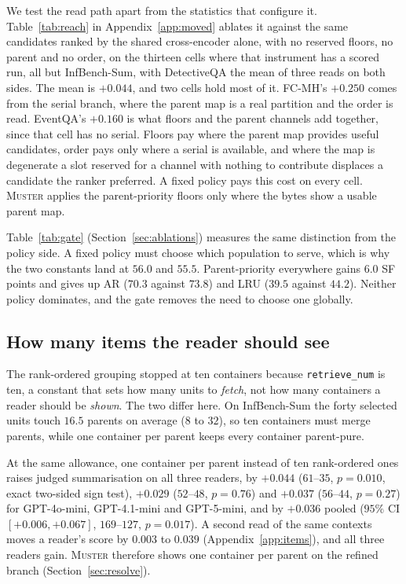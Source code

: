 \documentclass{article}
\newcommand{\sys}{\textsc{Muster}}
\begin{document}
We test the read path apart from the statistics that configure it.
Table~\ref{tab:reach} in Appendix~\ref{app:moved} ablates it against the same candidates ranked by the
shared cross-encoder alone, with no reserved floors, no parent and no order, on the thirteen cells
where that instrument has a scored run, all but InfBench-Sum, with DetectiveQA the mean of three reads on both sides. The mean is $+0.044$, and two cells hold most of it. FC-MH's
$+0.250$ comes from the serial branch, where the parent map is a real partition and the order is
read. EventQA's $+0.160$ is what floors and the parent channels add together, since that
cell has no serial. Floors pay where the parent map provides useful
candidates, order pays only where a serial is available, and
where the map is degenerate a slot reserved for a channel with nothing to contribute displaces a
candidate the ranker preferred. A fixed policy pays this cost on every cell. \sys{} applies the parent-priority floors only where the bytes show a usable parent map.

Table~\ref{tab:gate} (Section~\ref{sec:ablations}) measures the same distinction from the policy side.
A fixed policy must choose which population to serve, which is why the two constants land at $56.0$ and $55.5$.
Parent-priority everywhere gains $6.0$ SF points and gives up AR ($70.3$ against $73.8$) and LRU ($39.5$ against $44.2$). Neither policy dominates, and the gate removes the need to choose one globally.

\subsection{How many items the reader should see}\label{sec:items}

The rank-ordered grouping stopped at ten containers because \texttt{retrieve\_num} is
ten, a constant that sets how many units to \emph{fetch}, not how many containers a
reader should be \emph{shown}. The two differ here. On InfBench-Sum the forty selected units touch $16.5$
parents on average ($8$ to $32$), so ten containers must merge parents, while one container per parent
keeps every container parent-pure.

At the same allowance, one container per parent instead of ten rank-ordered ones raises judged summarisation on all
three readers, by $+0.044$ ($61$--$35$, $p=0.010$, exact two-sided sign test), $+0.029$ ($52$--$48$, $p=0.76$) and $+0.037$ ($56$--$44$,
$p=0.27$) for GPT-4o-mini, GPT-4.1-mini and GPT-5-mini, and by $+0.036$ pooled ($95\%$ CI $[+0.006, +0.067]$,
$169$--$127$, $p=0.017$). A second read of the same contexts moves a reader's score by $0.003$ to $0.039$
(Appendix~\ref{app:items}), and all three readers gain. \sys{} therefore
shows one container per parent on the refined branch (Section~\ref{sec:resolve}).
\end{document}
